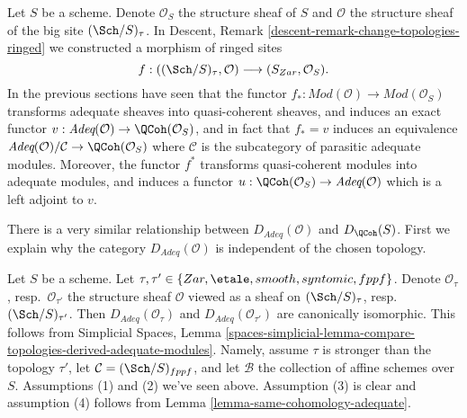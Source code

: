 \noindent
Let $S$ be a scheme. Denote $\mathcal{O}_S$ the structure sheaf of $S$
and $\mathcal{O}$ the structure sheaf of the big site $(\Sch/S)_\tau$.
In
Descent, Remark \ref{descent-remark-change-topologies-ringed}
we constructed a morphism of ringed sites
\begin{equation}
\label{equation-compare-big-small}
f :
((\Sch/S)_\tau, \mathcal{O})
\longrightarrow
(S_{Zar}, \mathcal{O}_S).
\end{equation}
In the previous sections have seen that the functor
$f_* : \textit{Mod}(\mathcal{O}) \to \textit{Mod}(\mathcal{O}_S)$
transforms adequate sheaves into quasi-coherent sheaves, and
induces an exact functor
$v : \textit{Adeq}(\mathcal{O}) \to \QCoh(\mathcal{O}_S)$, and
in fact that $f_* = v$ induces an equivalence
$\textit{Adeq}(\mathcal{O})/\mathcal{C} \to \QCoh(\mathcal{O}_S)$
where $\mathcal{C}$ is the subcategory of parasitic adequate modules.
Moreover, the functor $f^*$ transforms quasi-coherent modules
into adequate modules, and induces a functor
$u : \QCoh(\mathcal{O}_S) \to \textit{Adeq}(\mathcal{O})$
which is a left adjoint to $v$.

\medskip\noindent
There is a very similar relationship between
$D_{\textit{Adeq}}(\mathcal{O})$ and $D_\QCoh(S)$.
First we explain why the category $D_{\textit{Adeq}}(\mathcal{O})$
is independent of the chosen topology.

\begin{remark}
\label{remark-D-adeq-independence-topology}
Let $S$ be a scheme.
Let $\tau, \tau' \in \{Zar, \etale, smooth, syntomic, fppf\}$.
Denote $\mathcal{O}_\tau$, resp.\ $\mathcal{O}_{\tau'}$
the structure sheaf $\mathcal{O}$ viewed as a sheaf on
$(\Sch/S)_\tau$, resp.\ $(\Sch/S)_{\tau'}$.
Then $D_{\textit{Adeq}}(\mathcal{O}_\tau)$ and
$D_{\textit{Adeq}}(\mathcal{O}_{\tau'})$ are canonically isomorphic.
This follows from
Simplicial Spaces, Lemma
\ref{spaces-simplicial-lemma-compare-topologies-derived-adequate-modules}.
Namely, assume $\tau$ is stronger than the topology $\tau'$, let
$\mathcal{C} = (\Sch/S)_{fppf}$, and let $\mathcal{B}$ the collection
of affine schemes over $S$. Assumptions (1) and (2) we've seen above.
Assumption (3) is clear and assumption (4) follows from
Lemma \ref{lemma-same-cohomology-adequate}.
\end{remark}

